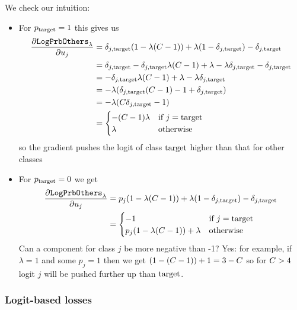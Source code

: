 \documentclass[../main.tex]{subfiles}
\begin{document}
We check our intuition:
\begin{itemize}
    \item For $p_{\mathrm{target}} = 1$ this gives us
          \begin{align*}
              \frac{\partial \mathtt{LogPrbOthers}_{\lambda}}{\partial u_j}
               & = \delta_{j, \mathrm{target}} (1 - \lambda (C - 1)) + \lambda (1 - \delta_{j, \mathrm{target}}) - \delta_{j, \mathrm{target}}      \\
               & = \delta_{j, \mathrm{target}} - \delta_{j, \mathrm{target}} \lambda (C - 1) + \lambda - \lambda \delta_{j, \mathrm{target}} - \delta_{j, \mathrm{target}} \\
               & = - \delta_{j, \mathrm{target}} \lambda (C - 1) + \lambda - \lambda \delta_{j, \mathrm{target}}             \\
               & = - \lambda (\delta_{j, \mathrm{target}} (C - 1) - 1 + \delta_{j, \mathrm{target}})                         \\
               & = - \lambda (C \delta_{j, \mathrm{target}} - 1)                                      \\
               & = \begin{cases}
                       - (C - 1) \lambda & \text{if } j = \mathrm{target} \\
                       \lambda                    & \text{otherwise}
                   \end{cases}
          \end{align*}
          so the gradient pushes the logit of class $\mathrm{target}$ higher than that for other classes

    \item For $p_{\mathrm{target}} = 0$ we get
          \begin{align*}
              \frac{\partial \mathtt{LogPrbOthers}_{\lambda}}{\partial u_j}
               & = p_j (1 - \lambda (C - 1)) + \lambda (1 - \delta_{j, \mathrm{target}}) - \delta_{j, \mathrm{target}}        \\
               & = \begin{cases}
                       -1                                           & \text{if } j = \mathrm{target} \\
                       p_j(1 - \lambda ( C -1 )) + \lambda & \text{otherwise}
                   \end{cases}
          \end{align*}
          Can a component for class $j$ be more negative than -1? Yes: for example, if $\lambda = 1$ and some $p_j = 1$ then we get $(1 - (C -1)) + 1 = 3 - C$ so for $C > 4$ logit $j$ will be pushed further up than $\mathrm{target}$.
\end{itemize}


\subsubsection{Logit-based losses}
\end{document}
